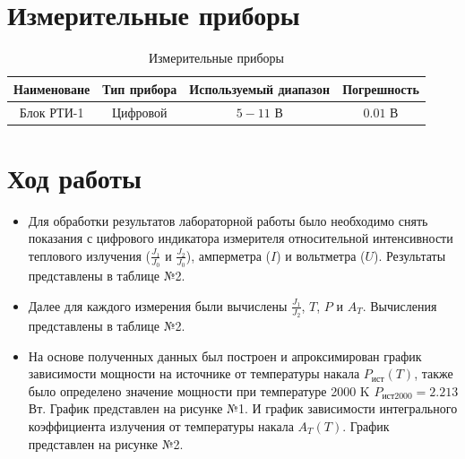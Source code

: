 \documentclass{article}
\begin{document}
\section{Измерительные приборы}
\begin{table}[h]
    \centering
    \bgroup
    \def\arraystretch{1.2}
    \begin{tabular}{|c|c|c|c|}
        \hline
        Наименоване & Тип прибора & Используемый диапазон & Погрешность \\
        \hline
        Блок РТИ-1 & Цифровой & $5-11$ В & $0.01$ В \\
        \hline
    \end{tabular}
    \egroup
    \caption{Измерительные приборы} 
\end{table}
\section{Ход работы}
\begin{itemize}
  \item Для обработки результатов лабораторной работы было необходимо снять показания с цифрового индикатора измерителя относительной интенсивности теплового излучения ($\frac{J_1}{J_0}$ и $\frac{J_2}{J_0}$), амперметра ($I$) и вольтметра ($U$). Результаты представлены в таблице №2.
  \item Далее для каждого измерения были вычислены $\frac{J_1}{J_2}$, $T$, $P$ и $A_T$. Вычисления представлены в таблице №2.
  \item На основе полученных данных был построен и апроксимирован график зависимости мощности на источнике от температуры накала $ P_{\textit{ист}}(T) $, также было определено значение мощности при температуре 2000 K $P_{\textit{ист}2000} = 2.213$ Вт. График представлен на рисунке №1. И график зависимости интегрального коэффициента излучения от температуры накала $ A_{T}(T) $. График представлен на рисунке №2.
\end{itemize}
\end{document}
